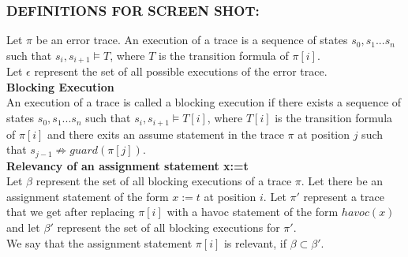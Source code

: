 \documentclass{article}
\newcommand{\limp}{\Rightarrow}
\begin{document}
\subsubsection{DEFINITIONS FOR SCREEN SHOT:}
Let $\pi$ be an error trace. An execution of a trace is a sequence of states $s_0, s_1...s_n$ such that $s_i, s_{i+1} \models T$, where $T$ is the transition formula of $\pi[i]$. \\
Let $\epsilon$ represent the set of all possible executions of the error trace. \\
\textbf{Blocking Execution} \\
An execution of a trace is called a blocking execution if there exists a sequence of states $s_0, s_1...s_n$ such that $s_i, s_{i+1} \models T[i]$, where $T[i]$ is the transition formula of $\pi[i]$ and there exits an assume statement in the trace $\pi$ at position $j$ such that $s_{j-1} \not \limp guard(\pi[j])$. \\
\textbf{Relevancy of an assignment statement x:=t} \\
Let $\beta$ represent the set of all blocking executions of a trace $\pi$. Let there be an assignment statement of the form $x:=t$ at position $i$. Let $\pi'$ represent a trace that we get after replacing $\pi[i]$ with a havoc statement of the form $havoc(x)$ and let $\beta'$ represent the set of all blocking executions for $\pi'$.\\
We say that the assignment statement $\pi[i]$ is relevant, if $\beta \subset \beta'$. 

\newpage
\end{document}
